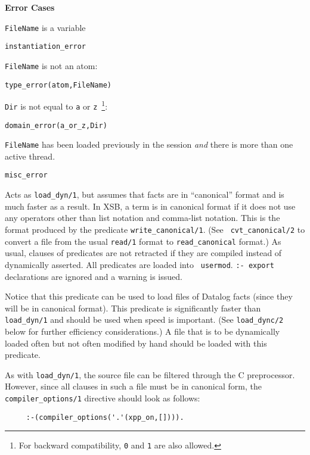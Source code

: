 \begin{description}
{\bf Error Cases}
\bi
\item 	{\tt FileName} is a variable
\bi
\item 	{\tt instantiation\_error}
\ei
\item 	{\tt FileName} is not an atom:
\bi
\item 	{\tt type\_error(atom,FileName)}
\ei
%
\item 	{\tt Dir} is not equal to {\tt a} or {\tt z}~\footnote{For
backward compatibility, {\tt 0} and {\tt 1} are also allowed.}: 
\bi
\item 	{\tt domain\_error(a\_or\_z,Dir)}
\ei
%
\item {\tt FileName} has been loaded previously in the session {\em and}
  there is more than one active thread.  
\bi
\item 	{\tt misc\_error}
\ei
\ei

    Acts as {\tt load\_dyn/1}, but assumes that facts are in
    ``canonical'' format and is much faster as a result.  In XSB, a
    term is in canonical format if it does not use any operators other
    than list notation and comma-list notation.  This is the format
    produced by the predicate {\tt write\_canonical/1}. (See {\tt
    cvt\_canonical/2} to convert a file from the usual {\tt read/1}
    format to {\tt read\_canonical} format.)  As usual, clauses of
    predicates are not retracted if they are compiled instead of
    dynamically asserted. All predicates are loaded into {\tt
    usermod}.  {\tt :- export} declarations are ignored and a warning
    is issued.

    Notice that this predicate can be used to load files of Datalog
    facts (since they will be in canonical format).  This predicate is
    significantly faster than {\tt load\_dyn/1} and should be used
    when speed is important.  (See {\tt load\_dync/2} below for
    further efficiency considerations.)  A file that is to be
    dynamically loaded often but not often modified by hand should be
    loaded with this predicate. 

    As with \verb|load_dyn/1|, the source file can be filtered through the C
    preprocessor. However, since all clauses in such a file must be in
    canonical form, the \verb|compiler_options/1| directive should look as
    follows:
    \begin{verbatim}
     :-(compiler_options('.'(xpp_on,[]))).      
    \end{verbatim}


\end{description}
